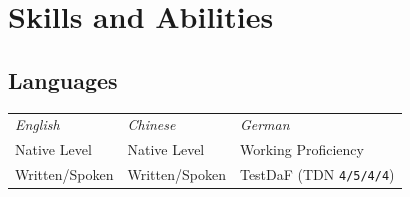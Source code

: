 \documentclass[11pt]{article}
\begin{document}

\section{\textcolor{section_4}{Skills and Abilities}}
\vspace{-\parskip}
	\subsection*{Languages}
		\begin{center}
			\begin{tabular}{@{} p{4cm} p{4cm} p{4.1cm} @{}}
				\textcolor{subheader}{\textit{English}} & \textcolor{subheader}{\textit{Chinese}} & \textcolor{subheader}{\textit{German}} \\
				Native Level & Native Level & Working Proficiency \\ 
				\textcolor{subtitles}{Written/Spoken} & \textcolor{subtitles}{Written/Spoken} & TestDaF (TDN \texttt{4/5/4/4})
			\end{tabular}
		\end{center}
\end{document}
